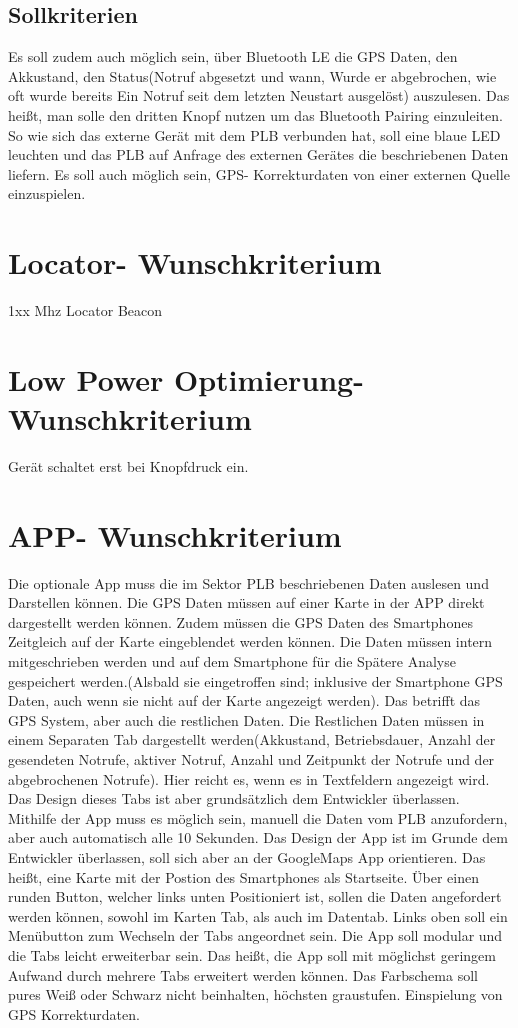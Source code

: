 \documentclass[a4paper]{scrreprt}
\begin{document}
\subsection{Sollkriterien}
Es soll zudem auch möglich sein, über Bluetooth LE die GPS Daten, den Akkustand, den Status(Notruf abgesetzt und wann, Wurde er abgebrochen, wie oft wurde bereits Ein Notruf seit dem letzten Neustart ausgelöst) auszulesen. Das heißt, man solle den dritten Knopf nutzen um das Bluetooth Pairing einzuleiten. So wie sich das externe Gerät mit dem PLB verbunden hat, soll eine blaue LED leuchten und das PLB auf Anfrage des externen Gerätes die beschriebenen Daten liefern. Es soll auch möglich sein, GPS- Korrekturdaten von einer externen Quelle einzuspielen.
\section{Locator- Wunschkriterium}
1xx Mhz Locator Beacon
\section{Low Power Optimierung- Wunschkriterium}
Gerät schaltet erst bei Knopfdruck ein.
\section{APP- Wunschkriterium}
Die optionale App muss die im Sektor PLB beschriebenen Daten auslesen und Darstellen können. Die GPS Daten müssen auf einer Karte in der APP direkt dargestellt werden können. Zudem müssen die GPS Daten des Smartphones Zeitgleich auf der Karte eingeblendet werden können. Die Daten müssen intern mitgeschrieben werden und auf dem Smartphone für die Spätere Analyse gespeichert werden.(Alsbald sie eingetroffen sind; inklusive der Smartphone GPS Daten, auch wenn sie nicht auf der Karte angezeigt werden). Das betrifft das GPS System, aber auch die restlichen Daten. Die Restlichen Daten müssen in einem Separaten Tab dargestellt werden(Akkustand, Betriebsdauer, Anzahl der gesendeten Notrufe, aktiver Notruf, Anzahl und Zeitpunkt der Notrufe und der abgebrochenen Notrufe). Hier reicht es, wenn es in Textfeldern angezeigt wird. Das Design dieses Tabs ist aber grundsätzlich dem Entwickler überlassen. Mithilfe der App muss es möglich sein, manuell die Daten vom PLB anzufordern, aber auch automatisch alle 10 Sekunden. Das Design der App ist im Grunde dem Entwickler überlassen, soll sich aber an der GoogleMaps App orientieren. Das heißt, eine Karte mit der Postion des Smartphones als Startseite. Über einen runden Button, welcher links unten Positioniert ist, sollen die Daten angefordert werden können, sowohl im Karten Tab, als auch im Datentab. Links oben soll ein Menübutton zum Wechseln der Tabs angeordnet sein. Die App soll modular und die Tabs leicht erweiterbar sein. Das heißt, die App soll mit möglichst geringem Aufwand durch mehrere Tabs erweitert werden können. Das Farbschema soll pures Weiß oder Schwarz nicht beinhalten, höchsten graustufen.
Einspielung von GPS Korrekturdaten.
\end{document}
